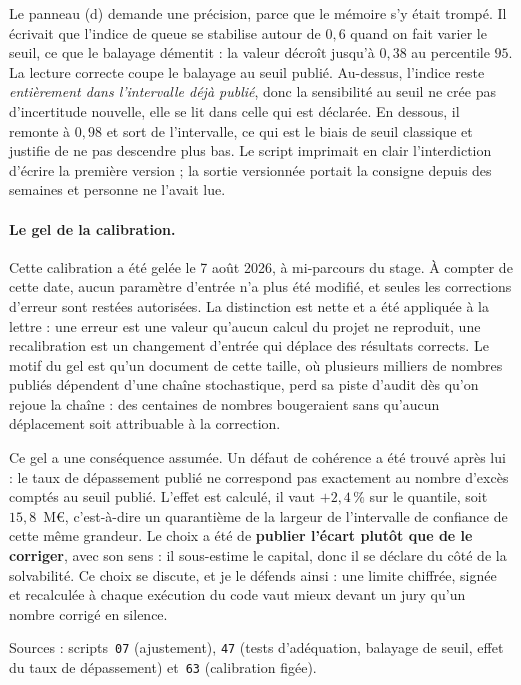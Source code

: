 \documentclass[12pt,a4paper]{article}
\theoremstyle{definition}
\begin{document}
Le panneau (d) demande une précision, parce que le mémoire s'y était trompé. Il
écrivait que l'indice de queue \og{}se stabilise autour de $0{,}6$\fg{} quand on
fait varier le seuil, ce que le balayage démentit : la valeur décroît jusqu'à
$0{,}38$ au percentile $95$. La lecture correcte coupe le balayage au seuil
publié. Au-dessus, l'indice reste \emph{entièrement dans l'intervalle déjà
publié}, donc la sensibilité au seuil ne crée pas d'incertitude nouvelle, elle se
lit dans celle qui est déclarée. En dessous, il remonte à $0{,}98$ et sort de
l'intervalle, ce qui est le biais de seuil classique et justifie de ne pas
descendre plus bas. Le script imprimait en clair l'interdiction d'écrire la
première version ; la sortie versionnée portait la consigne depuis des semaines et
personne ne l'avait lue.

\paragraph{Le gel de la calibration.} Cette calibration a été gelée le 7 août
2026, à mi-parcours du stage. À compter de cette date, aucun paramètre d'entrée
n'a plus été modifié, et seules les corrections d'erreur sont restées autorisées.
La distinction est nette et a été appliquée à la lettre : une erreur est une
valeur qu'aucun calcul du projet ne reproduit, une recalibration est un changement
d'entrée qui déplace des résultats corrects. Le motif du gel est qu'un document de
cette taille, où plusieurs milliers de nombres publiés dépendent d'une chaîne
stochastique, perd sa piste d'audit dès qu'on rejoue la chaîne : des centaines de
nombres bougeraient sans qu'aucun déplacement soit attribuable à la correction.

Ce gel a une conséquence assumée. Un défaut de cohérence a été trouvé après lui :
le taux de dépassement publié ne correspond pas exactement au nombre d'excès
comptés au seuil publié. L'effet est calculé, il vaut $+2{,}4\,\%$ sur le
quantile, soit $15{,}8$~M\euro, c'est-à-dire un quarantième de la largeur de
l'intervalle de confiance de cette même grandeur. Le choix a été de \textbf{publier
l'écart plutôt que de le corriger}, avec son sens : il sous-estime le capital,
donc il se déclare du côté de la solvabilité. Ce choix se discute, et je le
défends ainsi : une limite chiffrée, signée et recalculée à chaque exécution du
code vaut mieux devant un jury qu'un nombre corrigé en silence.

\vspace{4pt}
\noindent Sources : scripts~\texttt{07} (ajustement), \texttt{47} (tests
d'adéquation, balayage de seuil, effet du taux de dépassement) et~\texttt{63}
(calibration figée).
\end{document}
